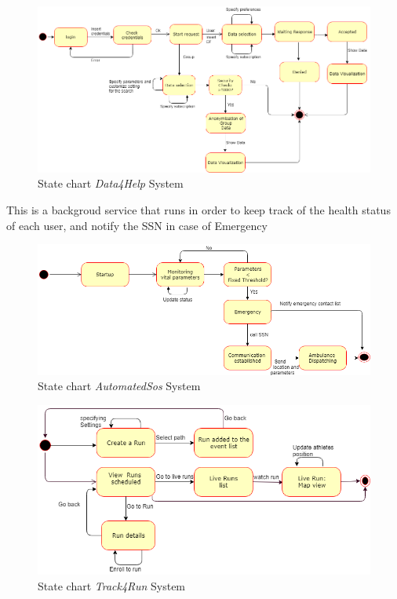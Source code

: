 \begin{figure}[H]
    \centering
    \includegraphics[scale=0.4]{Pictures/state chart 1.png}
    \caption{State chart  \emph{Data4Help} System}
\end{figure}
\newpage
This is a backgroud service that runs in order to keep track of the health status of each user, and notify the SSN in case of Emergency 
\begin{figure}[H]
    \centering
    \includegraphics[scale=0.4]{Pictures/state chart 2.png}
    \caption{State chart  \emph{AutomatedSos} System}
\end{figure}
\begin{figure}[H]
    \centering
    \includegraphics[scale=0.4]{Pictures/statechart3.png}
    \caption{State chart  \emph{Track4Run} System}
\end{figure}